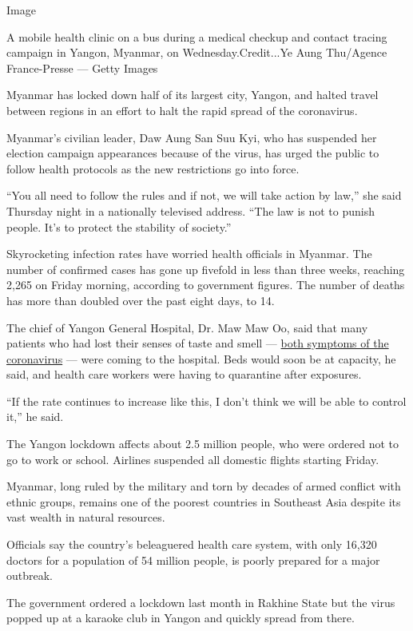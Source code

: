 Image

A mobile health clinic on a bus during a medical checkup and contact
tracing campaign in Yangon, Myanmar, on Wednesday.Credit...Ye Aung
Thu/Agence France-Presse --- Getty Images

Myanmar has locked down half of its largest city, Yangon, and halted
travel between regions in an effort to halt the rapid spread of the
coronavirus.

Myanmar's civilian leader, Daw Aung San Suu Kyi, who has suspended her
election campaign appearances because of the virus, has urged the public
to follow health protocols as the new restrictions go into force.

``You all need to follow the rules and if not, we will take action by
law,'' she said Thursday night in a nationally televised address. ``The
law is not to punish people. It's to protect the stability of society.''

Skyrocketing infection rates have worried health officials in Myanmar.
The number of confirmed cases has gone up fivefold in less than three
weeks, reaching 2,265 on Friday morning, according to government
figures. The number of deaths has more than doubled over the past eight
days, to 14.

The chief of Yangon General Hospital, Dr. Maw Maw Oo, said that many
patients who had lost their senses of taste and smell ---
\href{https://www.nytimes3xbfgragh.onion/2020/03/22/health/coronavirus-symptoms-smell-taste.html}{both
symptoms of the coronavirus} --- were coming to the hospital. Beds would
soon be at capacity, he said, and health care workers were having to
quarantine after exposures.

``If the rate continues to increase like this, I don't think we will be
able to control it,'' he said.

The Yangon lockdown affects about 2.5 million people, who were ordered
not to go to work or school. Airlines suspended all domestic flights
starting Friday.

Myanmar, long ruled by the military and torn by decades of armed
conflict with ethnic groups, remains one of the poorest countries in
Southeast Asia despite its vast wealth in natural resources.

Officials say the country's beleaguered health care system, with only
16,320 doctors for a population of 54 million people, is poorly prepared
for a major outbreak.

The government ordered a lockdown last month in Rakhine State but the
virus popped up at a karaoke club in Yangon and quickly spread from
there.

